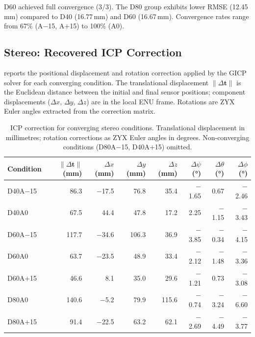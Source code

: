 D60 achieved full convergence (3/3). The D80 group exhibits lower RMSE (12.45\,mm) compared to D40 (16.77\,mm) and D60 (16.67\,mm). Convergence rates range from 67\% (A$-$15, A$+$15) to 100\% (A0).

\subsection{Stereo: Recovered ICP Correction}
\label{subsec:pa-results-stereo-transformation}

 reports the positional displacement and rotation correction applied by the GICP solver for each converging condition. The translational displacement $\lVert\Delta\mathbf{t}\rVert$ is the Euclidean distance between the initial and final sensor positions; component displacements ($\Delta x$, $\Delta y$, $\Delta z$) are in the local ENU frame. Rotations are ZYX Euler angles extracted from the correction matrix.

\begin{table}[htbp]
  \centering
  \small
  \setlength{\tabcolsep}{3pt}
  \caption{ICP correction for converging stereo conditions. Translational displacement in millimetres; rotation corrections as ZYX Euler angles in degrees. Non-converging conditions (D80A$-$15, D40A$+$15) omitted.}
  \label{tab:pa-results-stereo-transforms}
  \begin{tabular}{@{} l r r r r r r r @{}}
    \toprule
    \textbf{Condition} &
    \boldmath$\lVert\Delta\mathbf{t}\rVert$ \textbf{(mm)} &
    \boldmath$\Delta x$ \textbf{(mm)} &
    \boldmath$\Delta y$ \textbf{(mm)} &
    \boldmath$\Delta z$ \textbf{(mm)} &
    \boldmath$\Delta\psi$ \textbf{(°)} &
    \boldmath$\Delta\theta$ \textbf{(°)} &
    \boldmath$\Delta\phi$ \textbf{(°)} \\
    \midrule
    D40A$-$15 &  86.3 & $-$17.5 &    76.8 &    35.4 & $-$1.65 &    0.67 & $-$2.46 \\
    D40A0     &  67.5 &    44.4 &    47.8 &    17.2 &    2.25 & $-$1.15 & $-$3.43 \\
    D60A$-$15 & 117.7 & $-$34.6 &   106.3 &    36.9 & $-$3.85 & $-$0.34 & $-$4.15 \\
    D60A0     &  63.7 & $-$23.5 &    48.9 &    33.4 & $-$2.12 & $-$1.48 & $-$3.36 \\
    D60A$+$15 &  46.6 &     8.1 &    35.0 &    29.6 & $-$1.21 &    0.73 & $-$3.08 \\
    D80A0     & 140.6 &  $-$5.2 &    79.9 &   115.6 & $-$0.74 & $-$3.24 & $-$6.60 \\
    D80A$+$15 &  91.4 & $-$22.5 &    63.2 &    62.1 & $-$2.69 & $-$4.49 & $-$3.77 \\
    \bottomrule
  \end{tabular}
\end{table}


